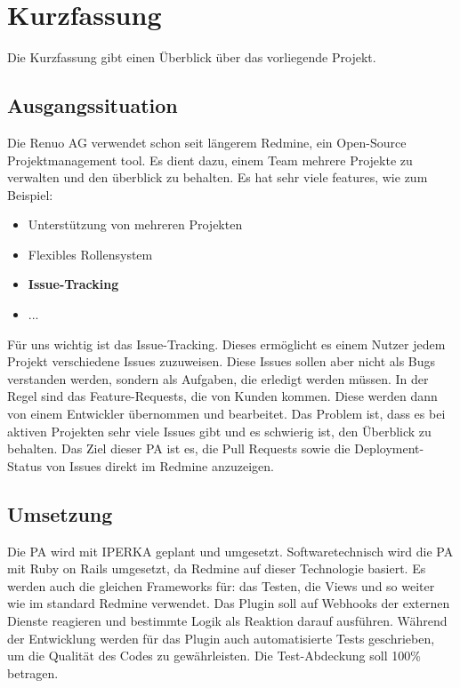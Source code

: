 \chapter{Kurzfassung}

Die Kurzfassung gibt einen Überblick über das vorliegende Projekt.

\section{Ausgangssituation}

Die Renuo AG verwendet schon seit längerem Redmine, ein Open-Source Projektmanagement tool. Es dient dazu, einem
Team mehrere Projekte zu verwalten und den überblick zu behalten. Es hat sehr viele features, wie zum Beispiel: \cite{redmine_homepage}
\begin{itemize}
    \item Unterstützung von mehreren Projekten
    \item Flexibles Rollensystem
    \item \textbf{Issue-Tracking}
    \item ...
\end{itemize}
Für uns wichtig ist das Issue-Tracking. Dieses ermöglicht es einem Nutzer jedem Projekt verschiedene Issues zuzuweisen.
Diese Issues sollen aber nicht als Bugs verstanden werden, sondern als Aufgaben, die erledigt werden müssen. In der Regel sind das
Feature-Requests, die von Kunden kommen. Diese werden dann von einem Entwickler übernommen und bearbeitet. \newline
Das Problem ist, dass es bei aktiven Projekten sehr viele Issues gibt und es schwierig ist, den Überblick zu behalten.
Das Ziel dieser PA ist es, die Pull Requests sowie die Deployment-Status von Issues direkt im Redmine anzuzeigen.

\section{Umsetzung}

Die PA wird mit IPERKA geplant und umgesetzt. \newline
Softwaretechnisch wird die PA mit Ruby on Rails umgesetzt, da Redmine auf dieser Technologie basiert. Es werden auch
die gleichen Frameworks für: das Testen, die Views und so weiter wie im standard Redmine verwendet. \newline
Das Plugin soll auf Webhooks der externen Dienste reagieren und bestimmte Logik als Reaktion darauf ausführen. \newline
Während der Entwicklung werden für das Plugin auch automatisierte Tests geschrieben, um die Qualität des Codes zu gewährleisten.
Die Test-Abdeckung soll 100\% betragen.

